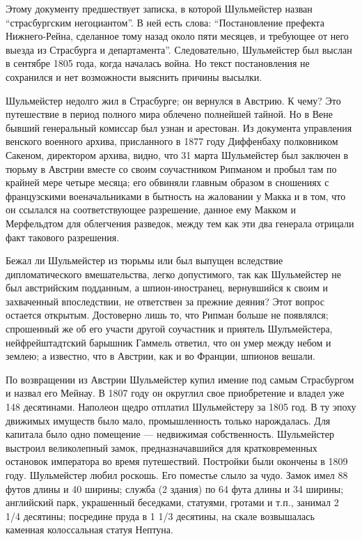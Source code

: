 \documentclass[
  oneside,
  12pt,
  titlepage]{book}
\begin{document}
Этому документу предшествует записка, в которой Шульмейстер назван ``страсбургским негоциантом''. В ней есть слова: ``Постановление префекта Нижнего-Рейна, сделанное тому назад около пяти месяцев, и требующее от него выезда из Страсбурга и департамента''. Следовательно, Шульмейстер был выслан в сентябре 1805 года, когда началась война. Но текст постановления не сохранился и нет возможности выяснить причины высылки.

Шульмейстер недолго жил в Страсбурге; он вернулся в Австрию. К чему? Это путешествие в период полного мира облечено полнейшей тайной. Но в Вене бывший генеральный комиссар был узнан и арестован. Из документа управления венского военного архива, присланного в 1877 году Диффенбаху полковником Сакеном, директором архива, видно, что 31 марта Шульмейстер был заключен в тюрьму в Австрии вместе со своим соучастником Рипманом и пробыл там по крайней мере четыре месяца; его обвиняли главным образом в сношениях с французскими военачальниками в бытность на жаловании у Макка и в том, что он ссылался на соответствующее разрешение, данное ему Макком и Мерфельдтом для облегчения разведок, между тем как эти два генерала отрицали факт такового разрешения.

Бежал ли Шульмейстер из тюрьмы или был выпущен вследствие дипломатического вмешательства, легко допустимого, так как Шульмейстер не был австрийским подданным, а шпион-иностранец, вернувшийся к своим и захваченный впоследствии, не ответствен за прежние деяния? Этот вопрос остается открытым. Достоверно лишь то, что Рипман больше не появлялся; спрошенный же об его участи другой соучастник и приятель Шулъмейстера, нейфрейштадтский барышник Гаммель ответил, что он умер между небом и землею; а известно, что в Австрии, как и во Франции, шпионов вешали.

По возвращении из Австрии Шульмейстер купил имение под самым Страсбургом и назвал его Мейнау. В 1807 году он округлил свое приобретение и владел уже 148 десятинами. Наполеон щедро отплатил Шульмейстеру за 1805 год. В ту эпоху движимых имуществ было мало, промышленность только нарождалась. Для капитала было одно помещение --- недвижимая собственность. Шульмейстер выстроил великолепный замок, предназначавшийся для кратковременных остановок императора во время путешествий. Постройки были окончены в 1809 году. Шульмейстер любил роскошь. Его поместье слыло за чудо. Замок имел 88 футов длины и 40 ширины; служба (2 здания) по 64 фута длины и 34 ширины; английский парк, украшенный беседками, статуями, гротами и т.п., занимал 2 1/4 десятины; посредине пруда в 1 1/3 десятины, на скале возвышалась каменная колоссальная статуя Нептуна.
\end{document}
